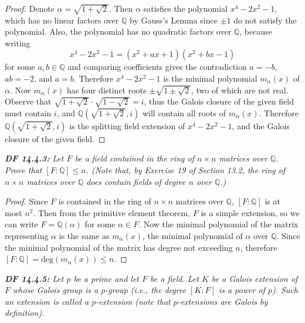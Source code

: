 \documentclass{article}
\begin{document}
  \begin{proof}
    Denote $\alpha=\sqrt{1+\sqrt{2}}$. Then $\alpha$ satisfies the
    polynomial $x^4-2x^2-1$, which has no linear factors over $\mathbb{Q}$
    by Gauss's Lemma since $\pm1$ do not satisfy the polynomial. Also, the
    polynomial has no quadratic factors over $\mathbb{Q}$, because writing
    \[x^4-2x^2-1 =(x^2+ax+1)(x^2+bx-1)\]
    for some $a,b\in\mathbb{Q}$ and comparing coefficients gives the
    contradiction $a=-b$, $ab=-2$, and $a=b$. Therefore $x^4-2x^2-1$ is the
    minimal polynomial $m_\alpha(x)$ of $\alpha$. Now $m_\alpha(x)$ has
    four distinct roots $\pm\sqrt{1\pm\sqrt{2}}$, two of which are not
    real. Observe that $\sqrt{1+\sqrt{2}} \cdot\sqrt{1-\sqrt{2}}=i$,
    thus the Galois closure of the given field must contain $i$, and
    $\mathbb{Q}(\sqrt{1+\sqrt{2}},i)$ will contain all roots of
    $m_\alpha(x)$. Therefore $\mathbb{Q}(\sqrt{1+\sqrt{2}},i)$ is the
    splitting field extension of $x^4-2x^2-1$, and the Galois closure
    of the given field.
  \end{proof}

\it \textbf{DF 14.4.3:} Let $F$ be a field contained in the ring of
  $n\times n$ matrices over $\mathbb{Q}$. Prove that $[F:\mathbb{Q}]\leq
  n$. (Note that, by Exercise 19 of Section 13.2, the ring of $n\times n$
  matrices over $\mathbb{Q}$ does contain fields of degree $n$ over
  $\mathbb{Q}$.)

  \begin{proof}
    Since $F$ is contained in the ring of $n\times n$ matrices over
    $\mathbb{Q}$, $[F:\mathbb{Q}]$ is at most $n^2$. Then from the
    primitive element theorem, $F$ is a simple extension, so we can write
    $F=\mathbb{Q}(\alpha)$ for some $\alpha\in F$. Now the minimal
    polynomial of the matrix representing $\alpha$ is the same as
    $m_\alpha(x)$, the minimal polynomial of $\alpha$ over $\mathbb{Q}$.
    Since the minimal polynomial of the matrix has degree not exceeding
    $n$, therefore $[F:\mathbb{Q}] =\text{deg}(m_\alpha(x))\leq n$.
  \end{proof}

\it \textbf{DF 14.4.5:} Let $p$ be a prime and let $F$ be a field. Let $K$
  be a Galois extension of $F$ whose Galois group is a $p$-group (i.e., the
  degree $[K:F]$ is a power of $p$). Such an extension is called a
  $p$-extension (note that $p$-extensions are Galois by definition).
\end{document}

